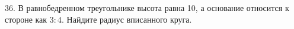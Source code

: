 36. В равнобедренном треугольнике высота равна 10, а основание относится к стороне как $3:4.$ Найдите радиус вписанного круга.\\
